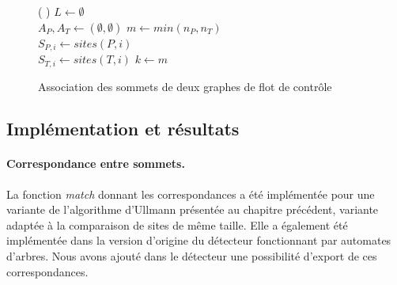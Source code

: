\begin{figure}[h]
\begin{algorithm}[H]
\DontPrintSemicolon
\caption{Association des sommets de deux graphes de flot de contrôle}
\SetAlgoLined
{}
\Fn(
){}{
$L\leftarrow \emptyset$\\
$A_P, A_T \leftarrow (\emptyset, \emptyset)$ 
$m\leftarrow min(n_P, n_T)$\\
 {
  $S_{P, i}\leftarrow sites(P, i)$\\
  $S_{T, i}\leftarrow sites(T, i)$
}
$k\leftarrow m$\\
}
\label{algo:correspondance_fine}
\end{algorithm}
\end{figure}

\subsection{Implémentation et résultats}
\paragraph{Correspondance entre sommets.}
La fonction \emph{match} donnant les correspondances a été implémentée pour une variante de l'algorithme d'Ullmann présentée au chapitre précédent, variante adaptée à la comparaison de sites de même taille.
Elle a également été implémentée dans la version d'origine du détecteur fonctionnant par automates d'arbres.
Nous avons ajouté dans le détecteur une possibilité d'export de ces correspondances.

